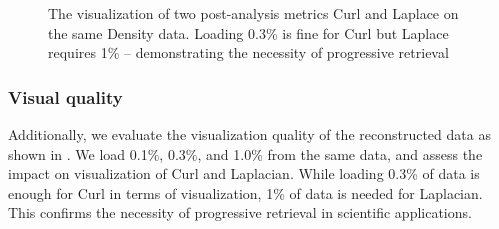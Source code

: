 \begin{figure}[ht] \centering


\vspace{-4mm}

\vspace{-4mm}
\caption{The visualization of two post-analysis metrics Curl and Laplace on the same Density data. Loading 0.3\% is fine for Curl but Laplace requires 1\% -- demonstrating the necessity of progressive retrieval}
\label{fig:visual}
\vspace{-6mm}
\end{figure}

\subsubsection{Visual quality}
Additionally, we evaluate the visualization quality of the reconstructed data as shown in . We load 0.1\%, 0.3\%, and 1.0\% from the same data, and assess the impact on visualization of Curl and Laplacian. While loading 0.3\% of data is enough for Curl in terms of visualization, 1\% of data is needed for Laplacian. This confirms the necessity of progressive retrieval in scientific applications.
